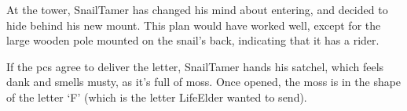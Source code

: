 \begin{multicols}{2}
At the tower, \gls{SnailTamer} has changed his mind about entering, and decided to hide behind his new mount.
This plan would have worked well, except for the large wooden pole mounted on the snail's back, indicating that it has a rider.

If the \glspl{pc} agree to deliver the letter,
\gls{SnailTamer} hands his satchel, which feels dank and smells musty, as it's full of moss.
Once opened, the moss is in the shape of the letter `F' (which is the letter \gls{LifeElder} wanted to send).

\end{multicols}
